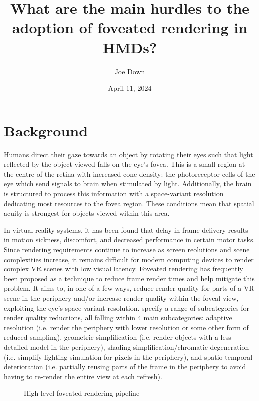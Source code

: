 \documentclass[a4paper,11pt]{article}
\title{What are the main hurdles to the adoption of foveated rendering in HMDs?}
\author{Joe Down}
\date{April 11, 2024}
\begin{document}
\maketitle

\section{Background}
Humans direct their gaze towards an object by rotating their eyes such that light reflected by the object viewed falls on the eye's fovea\cite{levoy1990gaze}. This is a small region at the centre of the retina with increased cone density\cite{pumphrey1948theory}: the photoreceptor cells of the eye which send signals to brain when stimulated by light\cite{arendt2003evolution}. Additionally, the brain is structured to process this information with a space-variant resolution dedicating most resources to the fovea region\cite{weber2009implementations}. These conditions mean that spatial acuity is strongest for objects viewed within this area\cite{levoy1990gaze}.

In virtual reality systems, it has been found that delay in frame delivery results in motion sickness, discomfort\cite{waltemate2016impact}, and decreased performance in certain motor tasks\cite{raaen2015measuring}. Since rendering requirements continue to increase as screen reolutions and scene complexities increase, it remains difficult for modern computing devices to render complex VR scenes with low visual latency\cite{wang2023foveated}. Foveated rendering has frequently been proposed as a technique to reduce frame render times and help mitigate this problem. It aims to, in one of a few ways, reduce render quality for parts of a VR scene in the periphery and/or increase render quality within the foveal view\cite{weier2016foveated}, exploiting the eye's space-variant resolution. \textcite{mohanto2022integrative} specify a range of subcategories for render quality reductions, all falling within 4 main subcategories: adaptive resolution (i.e. render the periphery with lower resolution or some other form of reduced sampling), geometric simplification (i.e. render objects with a less detailed model in the periphery), shading simplification/chromatic degeneration (i.e. simplify lighting simulation for pixels in the periphery), and spatio-temporal deterioration (i.e. partially reusing parts of the frame in the periphery to avoid having to re-render the entire view at each refresh).

\begin{figure}
  \begin{center}
    
    \caption{High level foveated rendering pipeline}
    \label{fig:pipeline}
  \end{center}
\end{figure}
\end{document}

